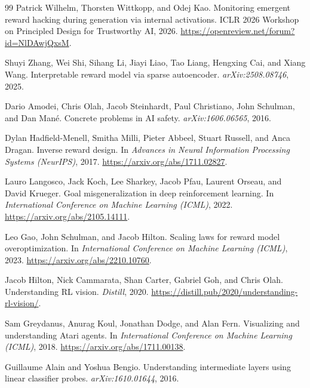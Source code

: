 \documentclass[11pt]{article}
\begin{document}
\begin{thebibliography}{99}
Patrick Wilhelm, Thorsten Wittkopp, and Odej Kao.
\newblock Monitoring emergent reward hacking during generation via internal activations.
\newblock ICLR 2026 Workshop on Principled Design for Trustworthy AI, 2026.
\newblock \url{https://openreview.net/forum?id=NlDAwjQxsM}.

Shuyi Zhang, Wei Shi, Sihang Li, Jiayi Liao, Tao Liang, Hengxing Cai, and Xiang Wang.
\newblock Interpretable reward model via sparse autoencoder.
\newblock \emph{arXiv:2508.08746}, 2025.

Dario Amodei, Chris Olah, Jacob Steinhardt, Paul Christiano, John Schulman, and Dan Man\'e.
\newblock Concrete problems in AI safety.
\newblock \emph{arXiv:1606.06565}, 2016.

Dylan Hadfield-Menell, Smitha Milli, Pieter Abbeel, Stuart Russell, and Anca Dragan.
\newblock Inverse reward design.
\newblock In \emph{Advances in Neural Information Processing Systems (NeurIPS)}, 2017.
\newblock \url{https://arxiv.org/abs/1711.02827}.

Lauro Langosco, Jack Koch, Lee Sharkey, Jacob Pfau, Laurent Orseau, and David Krueger.
\newblock Goal misgeneralization in deep reinforcement learning.
\newblock In \emph{International Conference on Machine Learning (ICML)}, 2022.
\newblock \url{https://arxiv.org/abs/2105.14111}.

Leo Gao, John Schulman, and Jacob Hilton.
\newblock Scaling laws for reward model overoptimization.
\newblock In \emph{International Conference on Machine Learning (ICML)}, 2023.
\newblock \url{https://arxiv.org/abs/2210.10760}.

Jacob Hilton, Nick Cammarata, Shan Carter, Gabriel Goh, and Chris Olah.
\newblock Understanding RL vision.
\newblock \emph{Distill}, 2020.
\newblock \url{https://distill.pub/2020/understanding-rl-vision/}.

Sam Greydanus, Anurag Koul, Jonathan Dodge, and Alan Fern.
\newblock Visualizing and understanding Atari agents.
\newblock In \emph{International Conference on Machine Learning (ICML)}, 2018.
\newblock \url{https://arxiv.org/abs/1711.00138}.

Guillaume Alain and Yoshua Bengio.
\newblock Understanding intermediate layers using linear classifier probes.
\newblock \emph{arXiv:1610.01644}, 2016.


\end{thebibliography}
\end{document}
